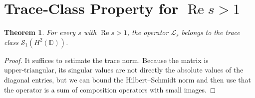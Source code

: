 \documentclass[11pt,a4paper]{article}
\newtheorem{theorem}{Theorem}[section]
\begin{document}
\section{Trace‑Class Property for \(\operatorname{Re}s>1\)}
\begin{theorem}\label{thm:traceclass}
For every \(s\) with \(\operatorname{Re}s>1\), the operator \(\mathcal{L}_s\) belongs to the trace class \(\mathcal{S}_1(H^2(\mathbb{D}))\).
\end{theorem}
\begin{proof}
It suffices to estimate the trace norm.  Because the matrix is upper‑triangular, its singular values are not directly the absolute values of the diagonal entries, but we can bound the Hilbert–Schmidt norm and then use that the operator is a sum of composition operators with small images.


\end{proof}
\end{document}
